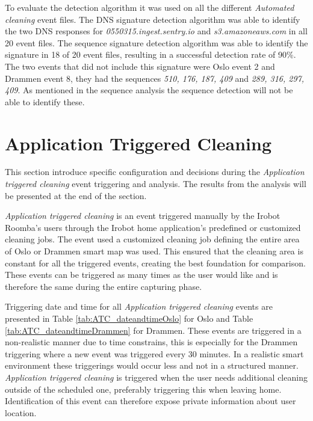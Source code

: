 To evaluate the detection algorithm it was used on all the different \textit{Automated cleaning} event files. The DNS signature detection algorithm was able to identify the two DNS responses for \textit{0550315.ingest.sentry.io} and \textit{s3.amazoneaws.com} in all 20 event files. The sequence signature detection algorithm was able to identify the signature in 18 of 20 event files, resulting in a successful detection rate of 90\%. The two events that did not include this signature were Oslo event 2 and Drammen event 8, they had the sequences \textit{510, 176, 187, 409} and \textit{289, 316, 297, 409}. As mentioned in the sequence analysis the sequence detection will not be able to identify these.     

\section{Application Triggered Cleaning}

This section introduce specific configuration and decisions during the \textit{Application triggered cleaning} event triggering and analysis. The results from the analysis will be presented at the end of the section. 

\textit{Application triggered cleaning} is an event triggered manually by the Irobot Roomba's users through the Irobot home application's predefined or customized cleaning jobs. The event used a customized cleaning job defining the entire area of Oslo or Drammen smart map was used. This ensured that the cleaning area is constant for all the triggered events, creating the best foundation for comparison. These events can be triggered as many times as the user would like and is therefore the same during the entire capturing phase. 

Triggering date and time for all \textit{Application triggered cleaning} events are presented in Table \ref{tab:ATC_dateandtimeOslo} for Oslo and Table \ref{tab:ATC_dateandtimeDrammen} for Drammen. These events are triggered in a non-realistic manner due to time constrains, this is especially for the Drammen triggering where a new event was triggered every 30 minutes. In a realistic smart environment these triggerings would occur less and not in a structured manner. \textit{Application triggered cleaning} is triggered when the user needs additional cleaning outside of the scheduled one, preferably triggering this when leaving home. Identification of this event can therefore expose private information about user location. 

